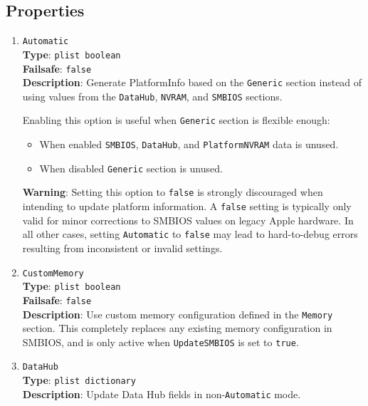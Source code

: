 \documentclass[]{article}
\makeatletter
\providecommand{\tightlist}{%
  \setlength{\itemsep}{0pt}\setlength{\parskip}{0pt}}
\renewcommand{\label}[1]{%
\zref@wrapper@immediate{\oldlabel{#1}}}  %
\makeatother
\begin{document}
\subsection{Properties}\label{platforminfoprops}

\begin{enumerate}

\item
  \texttt{Automatic}\\
  \textbf{Type}: \texttt{plist\ boolean}\\
  \textbf{Failsafe}: \texttt{false}\\
  \textbf{Description}: Generate PlatformInfo based on the \texttt{Generic}
  section instead of using values from the \texttt{DataHub}, \texttt{NVRAM},
  and \texttt{SMBIOS} sections.

  Enabling this option is useful when \texttt{Generic} section is flexible
  enough:
  \begin{itemize}
  \tightlist
  \item When enabled \texttt{SMBIOS}, \texttt{DataHub}, and
  \texttt{PlatformNVRAM} data is unused.
  \item When disabled \texttt{Generic} section is unused.
  \end{itemize}

  \textbf{Warning}: Setting this option to \texttt{false} is strongly discouraged when
  intending to update platform information. A \texttt{false} setting is typically only
  valid for minor corrections to SMBIOS values on legacy Apple hardware. In all other
  cases, setting \texttt{Automatic} to \texttt{false} may lead to hard-to-debug errors
  resulting from inconsistent or invalid settings.

\item
  \texttt{CustomMemory}\\
  \textbf{Type}: \texttt{plist\ boolean}\\
  \textbf{Failsafe}: \texttt{false}\\
  \textbf{Description}: Use custom memory configuration defined in the
  \texttt{Memory} section. This completely replaces any existing memory
  configuration in SMBIOS, and is only active when \texttt{UpdateSMBIOS}
  is set to \texttt{true}.

\item
  \texttt{DataHub}\\
  \textbf{Type}: \texttt{plist\ dictionary}\\
  \textbf{Description}: Update Data Hub fields in non-\texttt{Automatic} mode.


\end{enumerate}
\end{document}
